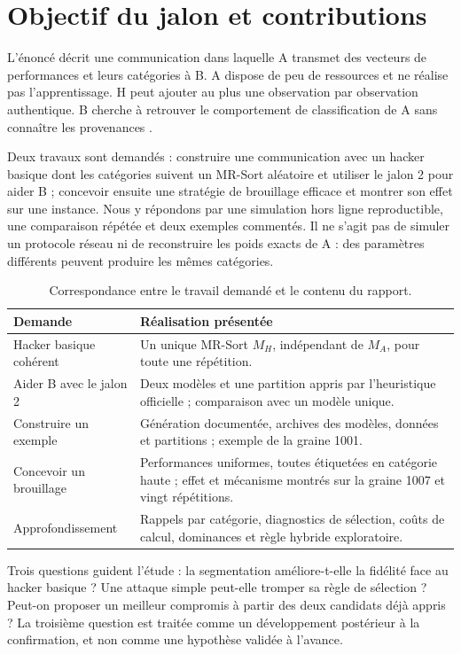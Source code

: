 \documentclass[11pt,a4paper]{article}
\begin{document}
\section{Objectif du jalon et contributions}

L'énoncé décrit une communication dans laquelle A transmet des vecteurs de
performances et leurs catégories à B. A dispose de peu de ressources et ne
réalise pas l'apprentissage. H peut ajouter au plus une observation par
observation authentique. B cherche à retrouver le comportement de classification
de A sans connaître les provenances \cite{sujet}.

Deux travaux sont demandés : construire une communication avec un hacker
basique dont les catégories suivent un MR-Sort aléatoire et utiliser le jalon 2
pour aider B ; concevoir ensuite une stratégie de brouillage efficace et
montrer son effet sur une instance. Nous y répondons par une simulation hors
ligne reproductible, une comparaison répétée et deux exemples commentés.
Il ne s'agit pas de simuler un protocole réseau ni de reconstruire les poids
exacts de A : des paramètres différents peuvent produire les mêmes catégories.

\begin{table}[htbp]\centering\small
\begin{tabularx}{\textwidth}{p{}X}
\toprule
Demande & Réalisation présentée \\
\midrule
Hacker basique cohérent & Un unique MR-Sort $M_H$, indépendant de $M_A$, pour toute une répétition. \\
Aider B avec le jalon 2 & Deux modèles et une partition appris par l'heuristique officielle ; comparaison avec un modèle unique. \\
Construire un exemple & Génération documentée, archives des modèles, données et partitions ; exemple de la graine 1001. \\
Concevoir un brouillage & Performances uniformes, toutes étiquetées en catégorie haute ; effet et mécanisme montrés sur la graine 1007 et vingt répétitions. \\
Approfondissement & Rappels par catégorie, diagnostics de sélection, coûts de calcul, dominances et règle hybride exploratoire. \\
\bottomrule
\end{tabularx}
\caption{Correspondance entre le travail demandé et le contenu du rapport.}
\end{table}

Trois questions guident l'étude : la segmentation améliore-t-elle la fidélité
face au hacker basique ? Une attaque simple peut-elle tromper sa règle de
sélection ? Peut-on proposer un meilleur compromis à partir des deux candidats
déjà appris ? La troisième question est traitée comme un développement
postérieur à la confirmation, et non comme une hypothèse validée à l'avance.
\end{document}
